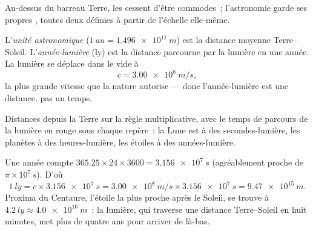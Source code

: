 Au-dessus du barreau Terre, les  cessent d'être commodes~;
l'astronomie garde ses propres , toutes deux définies à
partir de l'échelle elle-même.

\begin{definition}\label{def:g10:orders-of-magnitude:lightyear}
L'\emph{unité astronomique}
($\qty{1}{au} = \qty{1.496e11}{m}$) est la distance moyenne
Terre--Soleil. L'\emph{année-lumière}
(\unit{ly}) est la distance parcourue par la lumière en une année. La
lumière se déplace dans le vide à
\[
c = \qty{3.00e8}{m/s},
\]
la plus grande vitesse que la nature autorise --- donc
l'année-lumière est une distance, pas un temps.
\end{definition}

\begin{omfigure}

{\small Distances depuis la Terre sur la règle multiplicative, avec
le temps de parcours de la lumière en rouge sous chaque repère~: la
Lune est à des secondes-lumière, les planètes à des heures-lumière,
les étoiles à des années-lumière.}
\end{omfigure}

\begin{example}\label{ex:g10:orders-of-magnitude:ly}
Une année compte $365.25 \times 24 \times 3600 = \qty{3.156e7}{s}$
(agréablement proche de $\pi \times 10^{7}\,\unit{s}$). D'où
\[
\qty{1}{ly} = c \times \qty{3.156e7}{s}
= \qty{3.00e8}{m/s} \times \qty{3.156e7}{s}
= \qty{9.47e15}{m}.
\]
Proxima du Centaure, l'étoile la plus proche après le Soleil, se
trouve à $\qty{4.2}{ly} \approx \qty{4.0e16}{m}$~: la lumière, qui
traverse une distance Terre--Soleil en huit minutes, met plus de
quatre ans pour arriver de là-bas.
\end{example}

